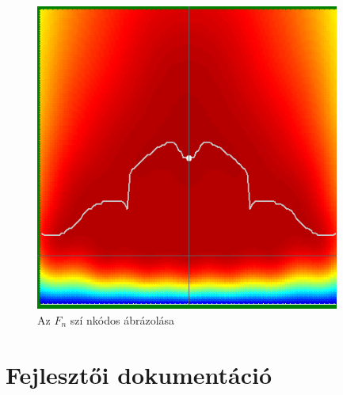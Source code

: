 \documentclass[oneside,titlepage,12pt,a4paper]{report}
\begin{document}
\begin{figure}[H]
\begin{center}
   \includegraphics[width=100mm]{./Abrak/Ereszkedo1/F_2sz.png}
  \caption{Az $F_n$ szí nkódos ábrázolása}
\end{center}
\end{figure}

\chapter{Fejlesztői dokumentáció}
\end{document}
